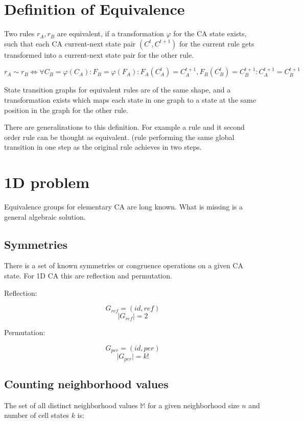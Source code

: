 \documentclass{ijuc}
\begin{document}
\section{Definition of Equivalence}

Two rules \( r_{A}, r_{B} \) are equivalent, if a transformation \(\varphi\) for the CA state exists, such that each CA
current-next state pair \( (C^{t}, C^{t+1}) \) for the current rule gets transformed into a current-next state pair
for the other rule.

\[ r_{A} \sim r_{B}  \Leftrightarrow  \forall C_{B}=\varphi(C_{A}) : F_{B}=\varphi(F_{A}) : F_{A}(C_{A}^{t}) = C_{A}^{t+1}, F_{B}(C_{B}^{t}) = C_{B}^{t+1} : C_{A}^{t+1} = C_{B}^{t+1} \]

State transition graphs for equivalent rules are of the same shape, and a transformation exists
which maps each state in one graph to a state at the same position in the graph for the other rule.

There are generalizations to this definition. For example a rule and it second order rule can be thought as equivalent.
(rule performing the same global transition in one step as the original rule achieves in two steps.

\section{1D problem}

Equivalence groups for elementary CA are long known. What is missing is a general algebraic solution.

\subsection{Symmetries}

There is a set of known symmetries or congruence operations on a given CA state.
For 1D CA this are reflection and permutation.

Reflection:

\[ G_{ref} = (id, ref) \]
\[ \vert G_{ref} \vert = 2 \]

Permutation:

\[ G_{per} = (id, per) \]
\[ \vert G_{per} \vert = k! \]

\subsection{Counting neighborhood values}

The set of all distinct neighborhood values $\mathbb{M}$ for a given neighborhood size $n$ and
number of cell states $k$ is:
\end{document}
